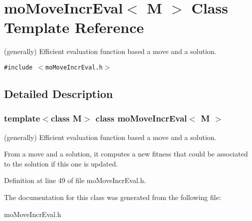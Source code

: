 \section{mo\-Move\-Incr\-Eval$<$ M $>$ Class Template Reference}
\label{classmo_move_incr_eval}
(generally) Efficient evaluation function based a move and a solution.  


{\tt \#include $<$mo\-Move\-Incr\-Eval.h$>$}



\subsection{Detailed Description}
\subsubsection*{template$<$class M$>$ class mo\-Move\-Incr\-Eval$<$ M $>$}

(generally) Efficient evaluation function based a move and a solution. 

From a move and a solution, it computes a new fitness that could be associated to the solution if this one is updated. 



Definition at line 49 of file mo\-Move\-Incr\-Eval.h.

The documentation for this class was generated from the following file:\begin{CompactItemize}
\item 
mo\-Move\-Incr\-Eval.h\end{CompactItemize}
